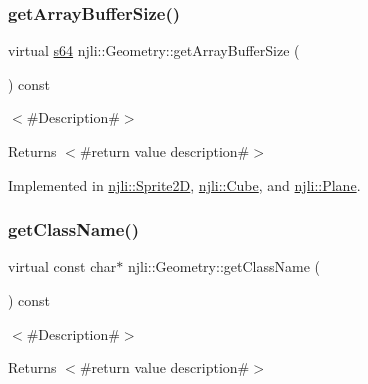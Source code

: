 \mbox{\label{classnjli_1_1_geometry_a97ec03852997043d6900af8009b390d9}} 
\subsubsection{\texorpdfstring{get\+Array\+Buffer\+Size()}{getArrayBufferSize()}}
{\footnotesize\ttfamily virtual \mbox{\hyperlink{_util_8h_a4258bfb2c3a440d06c4aaa3c2b450dde}{s64}} njli\+::\+Geometry\+::get\+Array\+Buffer\+Size (\begin{DoxyParamCaption}{ }\end{DoxyParamCaption}) const\hspace{0.3cm}{\ttfamily [pure virtual]}}

$<$\#\+Description\#$>$

\begin{DoxyReturn}{Returns}
$<$\#return value description\#$>$ 
\end{DoxyReturn}


Implemented in \mbox{\hyperlink{classnjli_1_1_sprite2_d_a7ce47c8c15d233418ebc5f012291a2d9}{njli\+::\+Sprite2D}}, \mbox{\hyperlink{classnjli_1_1_cube_a44544af58aae672e358e364877af9a16}{njli\+::\+Cube}}, and \mbox{\hyperlink{classnjli_1_1_plane_ad7e4c804fee51739e0696e34c7146a3a}{njli\+::\+Plane}}.

\mbox{\label{classnjli_1_1_geometry_abfa3fe3b5680b7b40c650fdc7a7fb737}} 
\subsubsection{\texorpdfstring{get\+Class\+Name()}{getClassName()}}
{\footnotesize\ttfamily virtual const char$\ast$ njli\+::\+Geometry\+::get\+Class\+Name (\begin{DoxyParamCaption}{ }\end{DoxyParamCaption}) const\hspace{0.3cm}{\ttfamily [virtual]}}

$<$\#\+Description\#$>$

\begin{DoxyReturn}{Returns}
$<$\#return value description\#$>$ 
\end{DoxyReturn}


